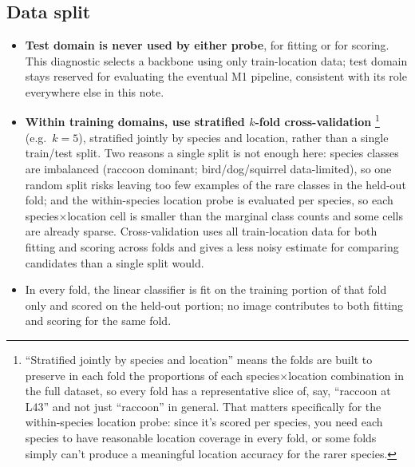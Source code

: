\subsection{Data split}
\label{app:probe:split}
\begin{itemize}[leftmargin=1.5em]
\item \textbf{Test domain is never used by either probe}, for fitting or for scoring. This 
      diagnostic selects
      a backbone using only train-location data; test domain stays reserved for evaluating the 
      eventual M1 pipeline, consistent with its role everywhere else in this note.
\item \textbf{Within training domains, use stratified $k$-fold cross-validation}
	\footnote{``Stratified jointly by species and location'' means the folds are built to preserve 
	in each fold the proportions of each species$\times$location combination in the full dataset, so 
	every fold has a representative slice of, say, ``raccoon at L43'' and not just ``raccoon'' in 
	general. That matters specifically for the within-species location probe: since it's scored per 
	species, you need each species to have reasonable location coverage in every fold, or some folds 
	simply can't produce a meaningful location accuracy for the rarer species.}
	(e.g.\ $k=5$), stratified
      jointly by species and location, rather than a single train/test split. Two reasons a single
      split is not enough here: species classes are imbalanced (raccoon dominant; bird/dog/squirrel
      data-limited), so one random split risks leaving too few examples of the rare classes in the
      held-out fold; and the within-species location probe is evaluated per species, so each
      species$\times$location cell is smaller than the marginal class counts and some cells are already
      sparse. Cross-validation uses all train-location data for both fitting and scoring across folds
      and gives a less noisy estimate for comparing candidates than a single split would.
\item In every fold, the linear classifier is fit on the training portion of that fold only and scored
      on the held-out portion; no image contributes to both fitting and scoring for the same fold.
\end{itemize}
\vspace{\dimexpr-\parskip+3pt\relax}
